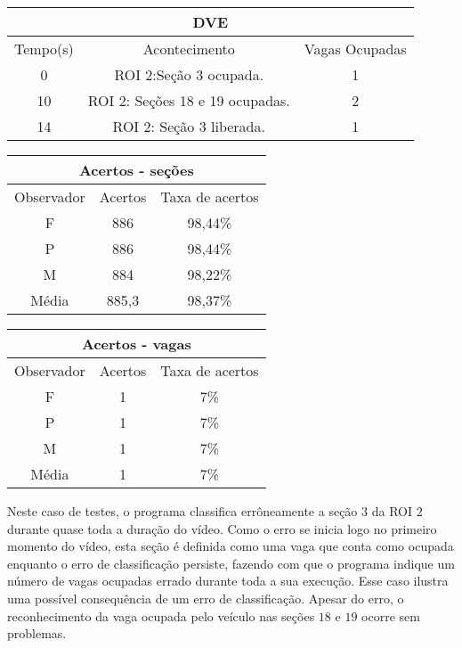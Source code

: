 \begin{center}
\begin{tabular}{|c||c||c|}
\hline
\multicolumn{3}{|c|}{DVE}  \\ \hline \hline
Tempo(s) & Acontecimento & Vagas Ocupadas\\ \hline
0 & ROI 2:Seção 3 ocupada. & 1 \\ \hline
10 & ROI 2: Seções 18 e 19 ocupadas. & 2\\ \hline
14 & ROI 2: Seção 3 liberada. & 1\\
\hline
\end{tabular}
\end{center}

\begin{center}
\begin{tabular}{|c||c||c|}
\hline
\multicolumn{3}{|c|}{Acertos - seções}  \\ \hline \hline
Observador & Acertos& Taxa de acertos \\ \hline
F & 886 & 98,44\% \\  \hline
P & 886 & 98,44\% \\ \hline
M & 884 & 98,22\% \\ \hline
Média & 885,3 & 98,37\% \\
\hline
\end{tabular}
\end{center}

\begin{center}
\begin{tabular}{|c||c||c|}
\hline
\multicolumn{3}{|c|}{Acertos - vagas}  \\ \hline \hline
Observador & Acertos & Taxa de acertos \\ \hline
F & 1 & 7\% \\  \hline
P & 1 & 7\% \\ \hline
M & 1 & 7\% \\ \hline
Média & 1 & 7\% \\
\hline
\end{tabular}
\end{center}

Neste caso de testes, o programa classifica errôneamente a seção $3$ da ROI $2$ durante quase toda a duração do vídeo. Como o erro se inicia logo no primeiro momento do vídeo, esta seção é definida como uma vaga que conta como ocupada enquanto o erro de classificação persiste, fazendo com que o programa indique um número de vagas ocupadas errado durante toda a sua execução. Esse caso ilustra uma possível consequência de um erro de classificação. Apesar do erro, o reconhecimento da vaga ocupada pelo veículo nas seções $18$ e $19$ ocorre sem problemas.

